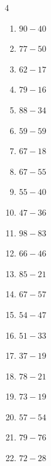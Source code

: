 \begin{multicols}{4}
\begin{enumerate}
  \item $90-40$
        \phantom{$=50$}

  \item $77-50$
        \phantom{$=27$}

  \item $62-17$
        \phantom{$=45$}

  \item $79-16$
        \phantom{$=63$}

  \item $88-34$
        \phantom{$=54$}

\columnbreak %

  \item $59-59$
        \phantom{$=0$}

  \item $67-18$
        \phantom{$=49$}

  \item $67-55$
        \phantom{$=12$}

  \item $55-40$
        \phantom{$=15$}

  \item $47-36$
        \phantom{$=11$}

  \item $98-83$
        \phantom{$=15$}

  \item $66-46$
        \phantom{$=20$}

  \item $85-21$
        \phantom{$=64$}

  \item $67-57$
        \phantom{$=10$}

  \item $54-47$
        \phantom{$=7$}

  \item $51-33$
        \phantom{$=18$}

  \item $37-19$
        \phantom{$=18$}

  \item $78-21$
        \phantom{$=57$}

  \item $73-19$
        \phantom{$=54$}

  \item $57-54$
        \phantom{$=3$}

  \item $79-76$
        \phantom{$=3$}

  \item $72-28$
        \phantom{$=44$}


\end{enumerate}
\end{multicols}
